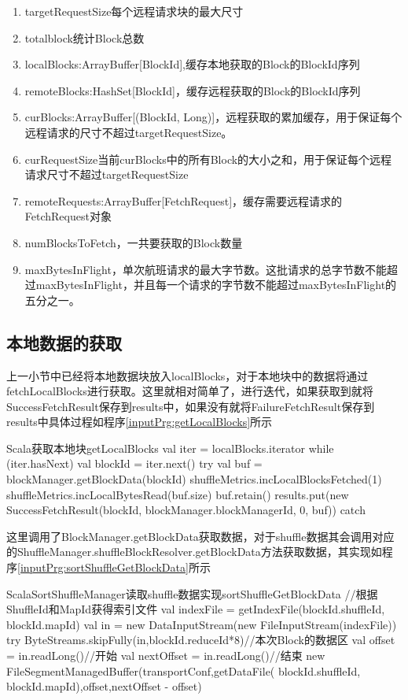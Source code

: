 \begin{enumerate}[\bfseries 1]
	\item targetRequestSize每个远程请求块的最大尺寸
	\item totalblock统计Block总数
	\item localBlocks:ArrayBuffer[BlockId],缓存本地获取的Block的BlockId序列
	\item remoteBlocks:HashSet[BlockId]，缓存远程获取的Block的BlockId序列
	\item curBlocks:ArrayBuffer[(BlockId, Long)]，远程获取的累加缓存，用于保证每个远程请求的尺寸不超过targetRequestSize。
	\item  curRequestSize当前curBlocks中的所有Block的大小之和，用于保证每个远程请求尺寸不超过targetRequestSize
	\item remoteRequests:ArrayBuffer[FetchRequest]，缓存需要远程请求的FetchRequest对象
	\item numBlocksToFetch，一共要获取的Block数量
	\item maxBytesInFlight，单次航班请求的最大字节数。这批请求的总字节数不能超过maxBytesInFlight，并且每一个请求的字节数不能超过maxBytesInFlight的五分之一。
\end{enumerate}
\subsection{本地数据的获取}
上一小节中已经将本地数据块放入localBlocks，对于本地块中的数据将通过fetchLocalBlocks进行获取。这里就相对简单了，进行迭代，如果获取到就将SuccessFetchResult保存到results中，如果没有就将FailureFetchResult保存到results中具体过程如程序\ref{inputPrg:getLocalBlocks}所示
\begin{codeInput}{Scala}{获取本地块}{getLocalBlocks}
val iter = localBlocks.iterator
while (iter.hasNext) {
  val blockId = iter.next()
  try {
    val buf = blockManager.getBlockData(blockId)
    shuffleMetrics.incLocalBlocksFetched(1)
    shuffleMetrics.incLocalBytesRead(buf.size)
    buf.retain()
    results.put(new SuccessFetchResult(blockId, blockManager.blockManagerId, 0, buf))
  } catch {
  }
}
\end{codeInput}
这里调用了BlockManager.getBlockData获取数据，对于shuffle数据其会调用对应的ShuffleManager.shuffleBlockResolver.getBlockData方法获取数据，其实现如程序\ref{inputPrg:sortShuffleGetBlockData}所示
\begin{codeInput}{Scala}{SortShuffleManager读取shuffle数据实现}{sortShuffleGetBlockData}
//根据ShuffleId和MapId获得索引文件
val indexFile = getIndexFile(blockId.shuffleId, blockId.mapId)
val in = new DataInputStream(new FileInputStream(indexFile))
try {
  ByteStreams.skipFully(in,blockId.reduceId*8)//本次Block的数据区
  val offset = in.readLong()//开始
  val nextOffset = in.readLong()//结束
  new FileSegmentManagedBuffer(transportConf,getDataFile(
  blockId.shuffleId, blockId.mapId),offset,nextOffset - offset)
} 
\end{codeInput}

